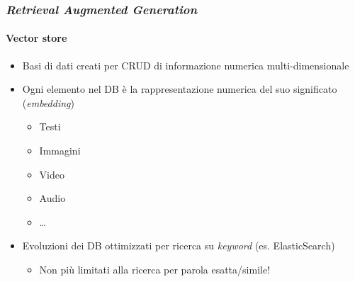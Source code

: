 \begin{frame}[t] \frametitle{\emph{Retrieval Augmented Generation}}
\framesubtitle{Vector store}
{\normalsize
    \begin{minipage}[t]{\textwidth}
        \begin{itemize}[leftmargin=10pt,align=right]
            \item[\alert{\faArrowCircleRight}] Basi di dati creati per CRUD di informazione \alert{numerica multi-dimensionale}
            \item[\alert{\faArrowCircleRight}] Ogni elemento nel DB è la rappresentazione numerica del suo significato (\textit{embedding})
            \begin{itemize}[leftmargin=10pt,align=right]
                \item[\alert{\faArrowCircleRight}] Testi
                \item[\alert{\faArrowCircleRight}] Immagini
                \item[\alert{\faArrowCircleRight}] Video
                \item[\alert{\faArrowCircleRight}] Audio
                \item[\alert{\faArrowCircleRight}] \ldots
            \end{itemize}
            \item[\alert{\faArrowCircleRight}] Evoluzioni dei DB ottimizzati per ricerca su \textit{keyword} (es. ElasticSearch)
            \begin{itemize}[leftmargin=10pt,align=right]
                \item[\alert{\faExclamationTriangle}] Non più limitati alla ricerca per parola esatta/simile!
            \end{itemize}
        \end{itemize}
    \end{minipage}
}
\end{frame}
%
